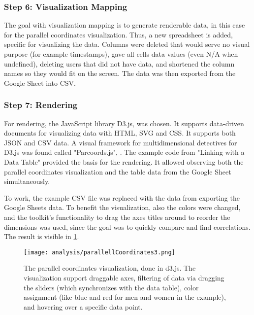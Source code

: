 \subsubsection{Step 6: Visualization Mapping}
The goal with visualization mapping is to generate renderable data, in this case for the parallel coordinates visualization. Thus, a new spreadsheet is added, specific for visualizing the data. Columns were deleted that would serve no visual purpose (for example timestamps), gave all cells data values (even N/A when undefined), deleting users that did not have data, and shortened the column names so they would fit on the screen. The data was then exported from the Google Sheet into CSV.

\subsubsection{Step 7: Rendering}

For rendering, the JavaScript library D3.js, \citep{d3} was chosen. It supports data-driven documents for visualizing data with HTML, SVG and CSS. It supports both JSON and CSV data. A visual framework for multidimensional detectives for D3.js was found called "Parcoords.js", \cite{parcoords}. The example code from "Linking with a Data Table" provided the basis for the rendering. It allowed observing both the parallel coordinates visualization and the table data from the Google Sheet simultaneously.


To work, the example CSV file was replaced with the data from exporting the Google Sheets data. To benefit the visualization, also the colors were changed, and the toolkit's functionality to drag the axes titles around to reorder the dimensions was used, since the goal was to quickly compare and find correlations. The result is visible in \ref{fig:parallell-coordinates-1}.

\begin{figure}[h]
    \centering
    \texttt{[image: analysis/parallellCoordinates3.png]}
    \caption{The parallel coordinates visualization, done in d3.js. The visualization support draggable axes, filtering of data via dragging the sliders (which synchronizes with the data table), color assignment (like blue and red for men and women in the example), and hovering over a specific data point.}
    \label{fig:parallell-coordinates-1}
\end{figure}
